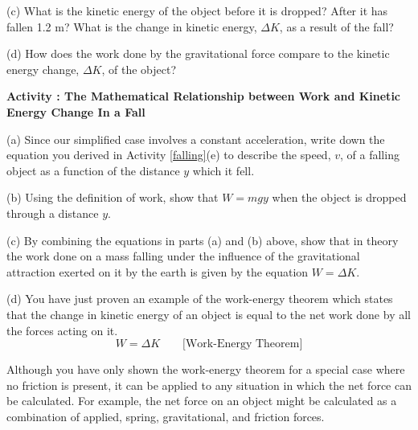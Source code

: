 (c) What is the kinetic energy of the object before it is dropped? After it
has fallen 1.2 m? What is the change in kinetic energy, \( \Delta  K\), as
a result of the fall?
\vspace{20mm}

(d) How does the work done by the gravitational force compare to the kinetic
energy change, \( \Delta  K\), of the object?
\vspace{20mm}

\textbf{Activity  : The Mathematical Relationship between Work and Kinetic Energy Change In a Fall }

(a) Since our simplified case involves a constant acceleration, write down the
equation you derived in Activity \ref{falling}(e) to describe the speed, $v$, of a falling
object as a function of the distance $y$ which it fell.
\vspace{10mm}

(b) Using the definition of work, show that $W = mgy$ when the object is dropped
through a distance $y$.
\vspace{10mm}

(c) By combining the equations in parts (a) and (b) above, show that in theory
the work done on a mass falling under the influence of the gravitational attraction
exerted on it by the earth is given by the equation \(W = \Delta  K\).
\vspace{20mm}

\newpage

(d) You have just proven an example of the work-energy theorem which states that
the change in kinetic energy of an object is equal to the net work done
by all the forces acting on it.
\[
W=\Delta K\qquad \mbox{[Work-Energy Theorem]}\]


Although you have only shown the work-energy theorem for a special case where
no friction is present, it can be applied to any situation in which the net
force can be calculated. For example, the net force on an object might be calculated as a combination of applied, spring, gravitational, and friction forces.


